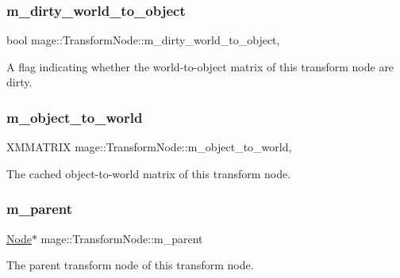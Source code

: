 \subsubsection{\texorpdfstring{m\+\_\+dirty\+\_\+world\+\_\+to\+\_\+object}{m\_dirty\_world\_to\_object}}
{\footnotesize\ttfamily bool mage\+::\+Transform\+Node\+::m\+\_\+dirty\+\_\+world\+\_\+to\+\_\+object\hspace{0.3cm}{\ttfamily [mutable]}, {\ttfamily [private]}}

A flag indicating whether the world-\/to-\/object matrix of this transform node are dirty. \hypertarget{structmage_1_1_transform_node_a79de447d6d40226d7ceb276007f5fbeb}{}\label{structmage_1_1_transform_node_a79de447d6d40226d7ceb276007f5fbeb} 
\subsubsection{\texorpdfstring{m\+\_\+object\+\_\+to\+\_\+world}{m\_object\_to\_world}}
{\footnotesize\ttfamily X\+M\+M\+A\+T\+R\+IX mage\+::\+Transform\+Node\+::m\+\_\+object\+\_\+to\+\_\+world\hspace{0.3cm}{\ttfamily [mutable]}, {\ttfamily [private]}}

The cached object-\/to-\/world matrix of this transform node. \hypertarget{structmage_1_1_transform_node_afad4b8198a5e4b1a3c46fb8e51fd17c2}{}\label{structmage_1_1_transform_node_afad4b8198a5e4b1a3c46fb8e51fd17c2} 
\subsubsection{\texorpdfstring{m\+\_\+parent}{m\_parent}}
{\footnotesize\ttfamily \hyperlink{classmage_1_1_node}{Node}$\ast$ mage\+::\+Transform\+Node\+::m\+\_\+parent\hspace{0.3cm}{\ttfamily [private]}}

The parent transform node of this transform node. \hypertarget{structmage_1_1_transform_node_a648c4757ba4d10e7749217077d11475d}{}\label{structmage_1_1_transform_node_a648c4757ba4d10e7749217077d11475d} 
